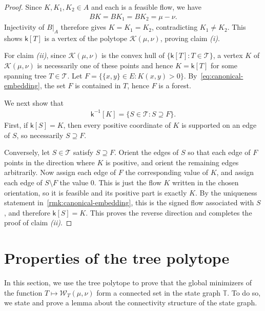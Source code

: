 \documentclass[11pt,a4paper]{article}
\newcommand{\wass}{{\mathcal{W}}}
\newcommand{\setoftrees}{{\mathcal{T}}}
\newcommand{\stategraph}{{\mathbb{T}}}
\newcommand{\embedding}{{\mathsf{k}}}
\newcommand{\flowpoly}{{\mathcal{K}}}
\begin{document}
\begin{proof}
        Since $K,K_1,K_2\in A$ and each is a feasible flow, we have
            \begin{align*}
                BK = BK_1 = BK_2 = \mu-\nu.
            \end{align*}
        Injectivity of $B|_A$ therefore gives $K=K_1=K_2$, contradicting $K_1\neq K_2$. This shows $\embedding[T]$ is a vertex of the polytope $\flowpoly(\mu,\nu)$, proving claim \emph{(i)}.

        For claim \emph{(ii)}, since $\flowpoly(\mu,\nu)$ is the convex hull of $\{\embedding[T]:T\in\setoftrees\}$, a vertex $K$ of $\flowpoly(\mu,\nu)$ is necessarily one of these points and hence $K=\embedding[T]$ for some spanning tree $T\in\setoftrees$. Let $F = \{\{x,y\}\in E : K(x,y) > 0\}$. By~\cref{eq:canonical-embedding}, the set $F$ is contained in $T$, hence $F$ is a forest.

        We next show that
            \begin{align*}
                \embedding^{-1}[K] = \{S\in\setoftrees : S\supseteq F\}.
            \end{align*}
        First, if $\embedding[S]=K$, then every positive coordinate of $K$ is supported on an edge of $S$, so necessarily $S\supseteq F$.

        Conversely, let $S\in\setoftrees$ satisfy $S\supseteq F$. Orient the edges of $S$ so that each edge of $F$ points in the direction where $K$ is positive, and orient the remaining edges arbitrarily. Now assign each edge of $F$ the corresponding value of $K$, and assign each edge of $S\setminus F$ the value $0$. This is just the flow $K$ written in the chosen orientation, so it is feasible and its positive part is exactly $K$. By the uniqueness statement in~\cref{rmk:canonical-embedding}, this is the signed flow associated with $S$, and therefore $\embedding[S]=K$. This proves the reverse direction and completes the proof of claim \emph{(ii)}.
    \end{proof}

\section{Properties of the tree polytope}\label{sec:connectivity-minimizers}

    In this section, we use the tree polytope to prove that the global minimizers of the function $T\mapsto \wass_T(\mu,\nu)$ form a connected set in the state graph $\stategraph$. To do so, we state and prove a lemma about the connectivity structure of the state graph.
\end{document}
